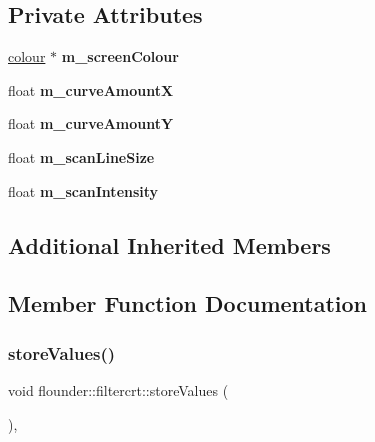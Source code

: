 \subsection*{Private Attributes}
\begin{DoxyCompactItemize}
\item 
\mbox{\label{classflounder_1_1filtercrt_a748eeea34c823085a53c1d0631d0104b}} 
\hyperlink{classflounder_1_1colour}{colour} $\ast$ {\bfseries m\+\_\+screen\+Colour}
\item 
\mbox{\label{classflounder_1_1filtercrt_a8edb88d85bdfb4b7dca89366460e721b}} 
float {\bfseries m\+\_\+curve\+AmountX}
\item 
\mbox{\label{classflounder_1_1filtercrt_ac1210ea97957231c933ac86a95764400}} 
float {\bfseries m\+\_\+curve\+AmountY}
\item 
\mbox{\label{classflounder_1_1filtercrt_a3b90d6d75537b4e6b4e492dfb18f7cf8}} 
float {\bfseries m\+\_\+scan\+Line\+Size}
\item 
\mbox{\label{classflounder_1_1filtercrt_a8dc28e43a32d9430c57225c9bd1a063d}} 
float {\bfseries m\+\_\+scan\+Intensity}
\end{DoxyCompactItemize}
\subsection*{Additional Inherited Members}


\subsection{Member Function Documentation}
\mbox{\label{classflounder_1_1filtercrt_a6b3d151d6e338a7c859aeea1016724dc}} 
\subsubsection{\texorpdfstring{store\+Values()}{storeValues()}}
{\footnotesize\ttfamily void flounder\+::filtercrt\+::store\+Values (\begin{DoxyParamCaption}{ }\end{DoxyParamCaption})\hspace{0.3cm}{\ttfamily [override]}, {\ttfamily [virtual]}}



